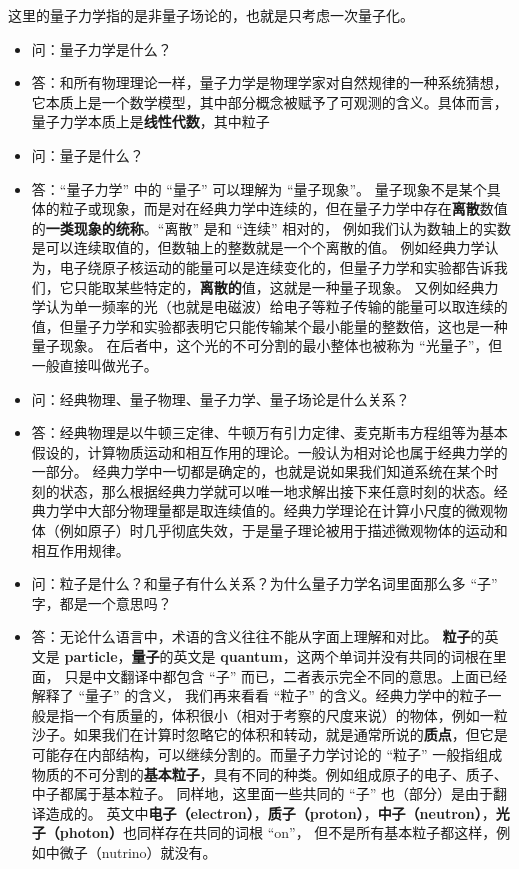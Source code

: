 
\begin{issues}
\issueDraft
\end{issues}

这里的量子力学指的是非量子场论的，也就是只考虑一次量子化。

\begin{itemize}
\item 问：量子力学是什么？
\item 答：和所有物理理论一样，量子力学是物理学家对自然规律的一种系统猜想，它本质上是一个数学模型，其中部分概念被赋予了可观测的含义。具体而言，量子力学本质上是\textbf{线性代数}，其中粒子
\item  问：量子是什么？
\item 答：“量子力学” 中的 “量子” 可以理解为 “量子现象”。 量子现象不是某个具体的粒子或现象，而是对在经典力学中连续的，但在量子力学中存在\textbf{离散}数值的\textbf{一类现象的统称}。“离散” 是和 “连续” 相对的， 例如我们认为数轴上的实数是可以连续取值的，但数轴上的整数就是一个个离散的值。 例如经典力学认为，电子绕原子核运动的能量可以是连续变化的，但量子力学和实验都告诉我们，它只能取某些特定的，\textbf{离散的}值，这就是一种量子现象。 又例如经典力学认为单一频率的光（也就是电磁波）给电子等粒子传输的能量可以取连续的值，但量子力学和实验都表明它只能传输某个最小能量的整数倍，这也是一种量子现象。 在后者中，这个光的不可分割的最小整体也被称为 “光量子”，但一般直接叫做光子。
\item 问：经典物理、量子物理、量子力学、量子场论是什么关系？
\item 答：经典物理是以牛顿三定律、牛顿万有引力定律、麦克斯韦方程组等为基本假设的，计算物质运动和相互作用的理论。一般认为相对论也属于经典力学的一部分。 经典力学中一切都是确定的，也就是说如果我们知道系统在某个时刻的状态，那么根据经典力学就可以唯一地求解出接下来任意时刻的状态。经典力学中大部分物理量都是取连续值的。经典力学理论在计算小尺度的微观物体（例如原子）时几乎彻底失效，于是量子理论被用于描述微观物体的运动和相互作用规律。
\item 问：粒子是什么？和量子有什么关系？为什么量子力学名词里面那么多 “子” 字，都是一个意思吗？
\item 答：无论什么语言中，术语的含义往往不能从字面上理解和对比。 \textbf{粒子}的英文是 \textbf{particle}，\textbf{量子}的英文是 \textbf{quantum}，这两个单词并没有共同的词根在里面， 只是中文翻译中都包含 “子” 而已，二者表示完全不同的意思。上面已经解释了 “量子” 的含义， 我们再来看看 “粒子” 的含义。经典力学中的粒子一般是指一个有质量的，体积很小（相对于考察的尺度来说）的物体，例如一粒沙子。如果我们在计算时忽略它的体积和转动，就是通常所说的\textbf{质点}，但它是可能存在内部结构，可以继续分割的。而量子力学讨论的 “粒子” 一般指组成物质的不可分割的\textbf{基本粒子}，具有不同的种类。例如组成原子的电子、质子、中子都属于基本粒子。 同样地，这里面一些共同的 “子” 也（部分）是由于翻译造成的。 英文中\textbf{电子（electron）}，\textbf{质子（proton）}，\textbf{中子（neutron）}，\textbf{光子（photon）}也同样存在共同的词根 “on”， 但不是所有基本粒子都这样，例如中微子（nutrino）就没有。
\end{itemize}


